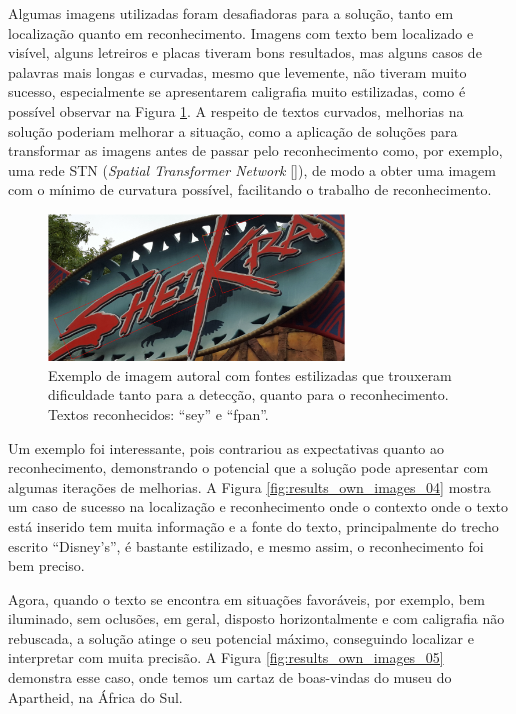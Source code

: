 Algumas imagens utilizadas foram desafiadoras para a solução, tanto em localização quanto em reconhecimento. Imagens 
com texto bem localizado e visível, alguns letreiros e placas tiveram bons resultados, mas alguns casos de palavras mais longas 
e curvadas, mesmo que levemente, não tiveram muito sucesso, especialmente se apresentarem caligrafia muito estilizadas, como é 
possível observar na Figura \ref{fig:results_own_images_03}. A respeito de textos curvados, melhorias na solução poderiam 
melhorar a situação, como a aplicação de soluções para transformar as imagens antes de passar pelo reconhecimento como, por 
exemplo, uma rede STN (\textit{Spatial Transformer Network} []), de modo a obter uma imagem com o mínimo de 
curvatura possível, facilitando o trabalho de reconhecimento.

\begin{figure}
    \centering
    \includegraphics[width=0.7\textwidth]{figs/resultados-autoral-03.png}
    \caption{Exemplo de imagem autoral com fontes estilizadas que trouxeram dificuldade tanto para a detecção, quanto 
    para o reconhecimento. Textos reconhecidos: “sey” e “fpan”.}
    \label{fig:results_own_images_03}
\end{figure}


Um exemplo foi interessante, pois contrariou as expectativas quanto ao reconhecimento, demonstrando o potencial que a 
solução pode apresentar com algumas iterações de melhorias. A Figura \ref{fig:results_own_images_04} mostra um caso de sucesso 
na localização e reconhecimento onde o contexto onde o texto está inserido tem muita informação e a fonte do texto, 
principalmente do trecho escrito “Disney’s”, é bastante estilizado, e mesmo assim, o reconhecimento foi bem preciso.


Agora, quando o texto se encontra em situações favoráveis, por exemplo, bem iluminado, sem oclusões, em geral, disposto 
horizontalmente e com caligrafia não rebuscada, a solução atinge o seu potencial máximo, conseguindo localizar e interpretar 
com muita precisão. A Figura \ref{fig:results_own_images_05} demonstra esse caso, onde temos um cartaz de boas-vindas do 
museu do Apartheid, na África do Sul.

